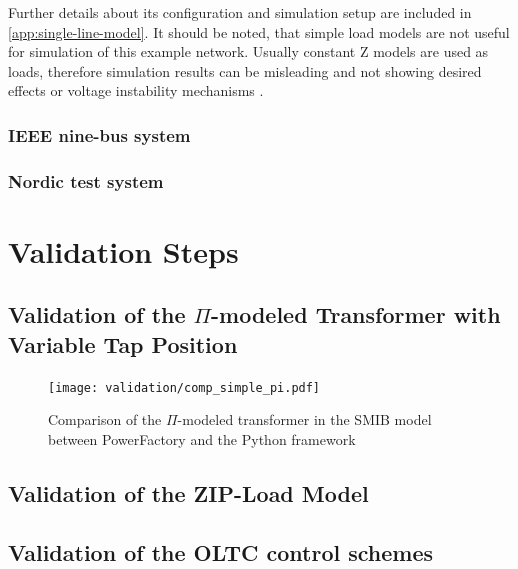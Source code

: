 Further details about its configuration and simulation setup are included in \autoref{app:single-line-model}. It should be noted, that simple load models are not useful for simulation of this example network. Usually constant Z models are used as loads, therefore simulation results can be misleading and not showing desired effects or voltage instability mechanisms \quelle. 

\subsubsection{IEEE nine-bus system}

\subsubsection{Nordic test system}

\section{Validation Steps}

\subsection{Validation of the $\Pi$-modeled Transformer with Variable Tap Position}

\begin{figure}[htb!]
    \centering
    \texttt{[image: validation/comp\_simple\_pi.pdf]}
    \caption{Comparison of the $\Pi$-modeled transformer in the \acs{SMIB} model between PowerFactory and the Python framework}
    \label{fig:comp-simple-pi}
\end{figure}

\subsection{Validation of the ZIP-Load Model}

\subsection{Validation of the OLTC control schemes}

